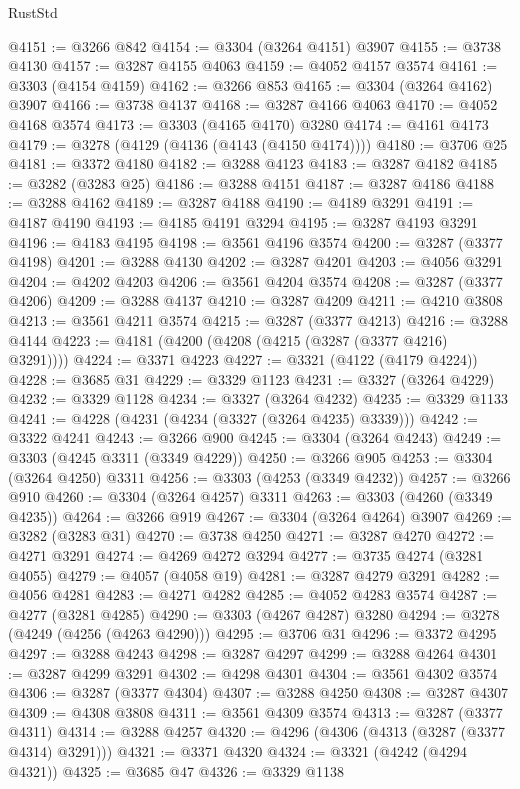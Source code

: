 \begin{lexlean}{RustStd}
\begin{coremodule}
@4151 := @3266 @842
@4154 := @3304 (@3264 @4151) @3907
@4155 := @3738 @4130
@4157 := @3287 @4155 @4063
@4159 := @4052 @4157 @3574
@4161 := @3303 (@4154 @4159)
@4162 := @3266 @853
@4165 := @3304 (@3264 @4162) @3907
@4166 := @3738 @4137
@4168 := @3287 @4166 @4063
@4170 := @4052 @4168 @3574
@4173 := @3303 (@4165 @4170) @3280
@4174 := @4161 @4173
@4179 := @3278 (@4129 (@4136 (@4143 (@4150 @4174))))
@4180 := @3706 @25
@4181 := @3372 @4180
@4182 := @3288 @4123
@4183 := @3287 @4182
@4185 := @3282 (@3283 @25)
@4186 := @3288 @4151
@4187 := @3287 @4186
@4188 := @3288 @4162
@4189 := @3287 @4188
@4190 := @4189 @3291
@4191 := @4187 @4190
@4193 := @4185 @4191 @3294
@4195 := @3287 @4193 @3291
@4196 := @4183 @4195
@4198 := @3561 @4196 @3574
@4200 := @3287 (@3377 @4198)
@4201 := @3288 @4130
@4202 := @3287 @4201
@4203 := @4056 @3291
@4204 := @4202 @4203
@4206 := @3561 @4204 @3574
@4208 := @3287 (@3377 @4206)
@4209 := @3288 @4137
@4210 := @3287 @4209
@4211 := @4210 @3808
@4213 := @3561 @4211 @3574
@4215 := @3287 (@3377 @4213)
@4216 := @3288 @4144
@4223 := @4181 (@4200 (@4208 (@4215 (@3287 (@3377 @4216) @3291))))
@4224 := @3371 @4223
@4227 := @3321 (@4122 (@4179 @4224))
@4228 := @3685 @31
@4229 := @3329 @1123
@4231 := @3327 (@3264 @4229)
@4232 := @3329 @1128
@4234 := @3327 (@3264 @4232)
@4235 := @3329 @1133
@4241 := @4228 (@4231 (@4234 (@3327 (@3264 @4235) @3339)))
@4242 := @3322 @4241
@4243 := @3266 @900
@4245 := @3304 (@3264 @4243)
@4249 := @3303 (@4245 @3311 (@3349 @4229))
@4250 := @3266 @905
@4253 := @3304 (@3264 @4250) @3311
@4256 := @3303 (@4253 (@3349 @4232))
@4257 := @3266 @910
@4260 := @3304 (@3264 @4257) @3311
@4263 := @3303 (@4260 (@3349 @4235))
@4264 := @3266 @919
@4267 := @3304 (@3264 @4264) @3907
@4269 := @3282 (@3283 @31)
@4270 := @3738 @4250
@4271 := @3287 @4270
@4272 := @4271 @3291
@4274 := @4269 @4272 @3294
@4277 := @3735 @4274 (@3281 @4055)
@4279 := @4057 (@4058 @19)
@4281 := @3287 @4279 @3291
@4282 := @4056 @4281
@4283 := @4271 @4282
@4285 := @4052 @4283 @3574
@4287 := @4277 (@3281 @4285)
@4290 := @3303 (@4267 @4287) @3280
@4294 := @3278 (@4249 (@4256 (@4263 @4290)))
@4295 := @3706 @31
@4296 := @3372 @4295
@4297 := @3288 @4243
@4298 := @3287 @4297
@4299 := @3288 @4264
@4301 := @3287 @4299 @3291
@4302 := @4298 @4301
@4304 := @3561 @4302 @3574
@4306 := @3287 (@3377 @4304)
@4307 := @3288 @4250
@4308 := @3287 @4307
@4309 := @4308 @3808
@4311 := @3561 @4309 @3574
@4313 := @3287 (@3377 @4311)
@4314 := @3288 @4257
@4320 := @4296 (@4306 (@4313 (@3287 (@3377 @4314) @3291)))
@4321 := @3371 @4320
@4324 := @3321 (@4242 (@4294 @4321))
@4325 := @3685 @47
@4326 := @3329 @1138

\end{coremodule}
\end{lexlean}
